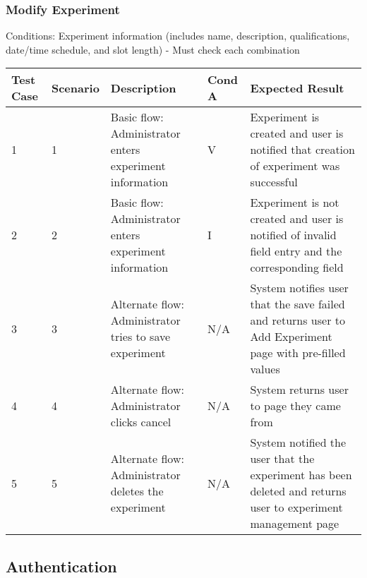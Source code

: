 \begin{landscape}
\subsubsection{Modify Experiment}
\begin{outline}[enumerate]
\1 [] Conditions:
\2 [A] Experiment information (includes name, description, qualifications, date/time schedule, and slot length) - Must check each combination
\end{outline}
\begin{table}[!h]
    \begin{tabular}{|l|l|p{3in}|l|p{3.25in}|}
        \hline
        Test Case & Scenario & Description & Cond A & Expected Result \\ \hline
        1 & 1 & Basic flow: Administrator enters experiment information & V & Experiment is created and user is notified that creation of experiment was successful \\ \hline
        2 & 2 & Basic flow: Administrator enters experiment information & I & Experiment is not created and user is notified of invalid field entry and the corresponding field \\ \hline
        3 & 3 & Alternate flow: Administrator tries to save experiment & N/A & System notifies user that the save failed and returns user to Add Experiment page with pre-filled values \\ \hline
        4 & 4 & Alternate flow: Administrator clicks cancel & N/A & System returns user to page they came from \\ \hline
        5 & 5 & Alternate flow: Administrator deletes the experiment & N/A & System notified the user that the experiment has been deleted and returns user to experiment management page \\ \hline
    \end{tabular}
\end{table}

\clearpage
\subsection{Authentication}

\end{landscape}
